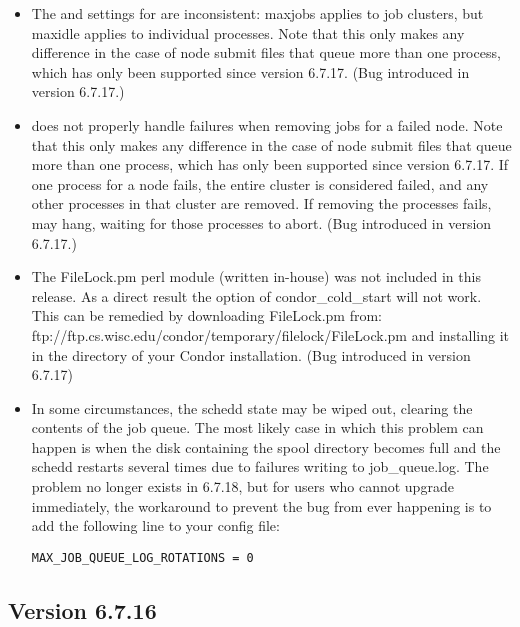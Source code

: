 \begin{itemize}
\item The  and  settings for  are
inconsistent: maxjobs applies to job clusters, but maxidle applies
to individual processes.  Note that this only makes any difference
in the case of node submit files that queue more than one process,
which has only been supported since version 6.7.17.
(Bug introduced in version 6.7.17.)

\item {} does not properly handle failures when removing
jobs for a failed node.  Note that this only makes any difference
in the case of node submit files that queue more than one process,
which has only been supported since version 6.7.17.  If one process
for a node fails, the entire cluster is considered failed, and any
other processes in that cluster are removed.  If removing the processes
fails,  may hang, waiting for those processes to abort.
(Bug introduced in version 6.7.17.)

\item The FileLock.pm perl module (written in-house) was not included
  in this release.  As a direct result the  option of
  condor\_cold\_start will not work.  This can be remedied by
  downloading FileLock.pm from:
  ftp://ftp.cs.wisc.edu/condor/temporary/filelock/FileLock.pm and
  installing it in the  directory of your Condor installation.
  (Bug introduced in version 6.7.17)

\item In some circumstances, the schedd state may be wiped out,
clearing the contents of the job queue.  The most likely case in which
this problem can happen is when the disk containing the spool
directory becomes full and the schedd restarts several times due to
failures writing to job\_queue.log.  The problem no longer exists in
6.7.18, but for users who cannot upgrade immediately, the workaround
to prevent the bug from ever happening is to add the following line to
your config file:

\begin{verbatim}
MAX_JOB_QUEUE_LOG_ROTATIONS = 0
\end{verbatim}

\end{itemize}

\subsection*{\label{sec:New-6-7.16}Version 6.7.16}

